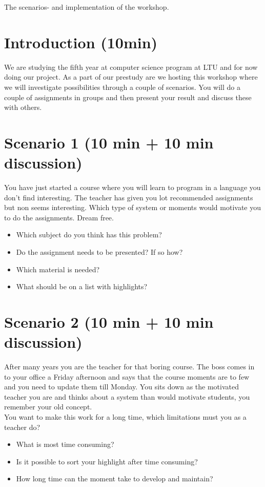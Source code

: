 The scenarios- and implementation of the workshop.

\section*{Introduction (10min)}
We are studying the fifth year at computer science program at LTU and for now doing our project. As a part of our prestudy are we hosting this workshop where we will investigate possibilities through a couple of scenarios. You will do a couple of assignments in groups and then present your result and discuss these with others.

\section*{Scenario 1 (10 min + 10 min discussion)}
You have just started a course where you will learn to program in a language you don't find interesting. The teacher has given you lot recommended assignments but non seems interesting. Which type of system or moments would motivate you to do the assignments. Dream free.
\begin{itemize}
\item Which subject do you think has this problem?
\item Do the assignment needs to be presented? If so how?
\item Which material is needed?
\item What should be on a list with highlights?
\end{itemize} 

\section*{Scenario 2 (10 min + 10 min discussion)}
After many years you are the teacher for that boring course. The boss comes in to your office a Friday afternoon and says that the course moments are to few and you need to update them till Monday. You sits down as the motivated teacher you are and thinks about a system than would motivate students, you remember your old concept. \\
You want to make this work for a long time, which limitations must you as a teacher do?\\
\begin{itemize}
\item What is most time consuming?
\item Is it possible to sort your highlight after time consuming?
\item How long time can the moment take to develop and maintain?
\end{itemize} 

